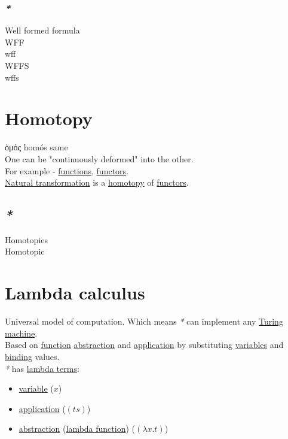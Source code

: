 \documentclass[a4paper,14pt,oneside]{book}
\begin{document}
\subsection{\emph{*}}
\label{sec:org3de1246}
\label{org598f15d}Well formed formula\\
\label{orge0e0c38}WFF\\
\label{orge78144e}wff\\
\label{org17da6f6}WFFS\\
\label{orgfb7ef1e}wffs\\

\chapter{\label{org77659bd}Homotopy}
\label{sec:orgdd258c8}
ὁμός homós same\\

One can be "continuously deformed" into the other.\\

For example - \hyperref[org50b1dc4]{functions}, \hyperref[org678f2bc]{functors}.\\
\hyperref[org7fcf4b5]{Natural transformation} is a \hyperref[org77659bd]{homotopy} of \hyperref[org678f2bc]{functors}.\\

\section{\emph{*}}
\label{sec:orgb8597d8}

\label{orgf306571}Homotopies\\
\label{org64448d9}Homotopic\\

\chapter{\label{org4a72ae8}Lambda calculus}
\label{sec:orge3da611}
Universal model of computation. Which means \emph{*} can implement any \hyperref[org7287f29]{Turing machine}.\\
Based on \hyperref[orgee59a2b]{function} \hyperref[orgf49d7a2]{abstraction} and \hyperref[org6880597]{application} by substituting \hyperref[org03ce465]{variables} and \hyperref[org1e01c1b]{binding} values.\\

\emph{*} has \hyperref[org93a3ea2]{lambda terms}:\\
\begin{itemize}
\item \hyperref[org3867557]{variable} (\(x\))\\
\item \hyperref[org6880597]{application} (\((ts)\))\\
\item \hyperref[orgf49d7a2]{abstraction} (\hyperref[orgb9478bf]{lambda function}) (\((\lambda x . t)\))\\
\end{itemize}
\end{document}

